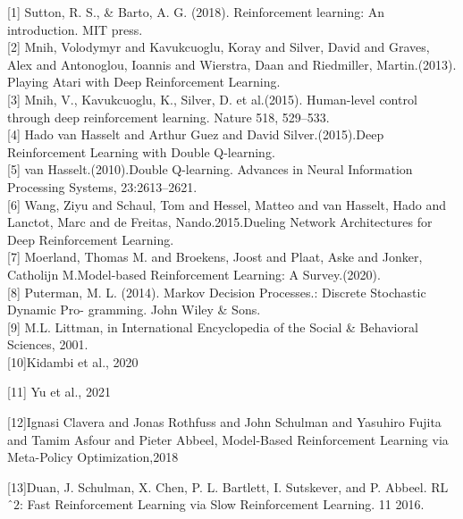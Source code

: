 \begin{thebibliography}{69}


   [1] Sutton, R. S., \& Barto, A. G. (2018). Reinforcement learning: An introduction. MIT press.\\

  [2]  Mnih, Volodymyr and Kavukcuoglu, Koray and Silver, David and Graves, Alex and Antonoglou, Ioannis and Wierstra, Daan and Riedmiller, Martin.(2013). Playing Atari with Deep Reinforcement Learning.\\

  [3] Mnih, V., Kavukcuoglu, K., Silver, D. et al.(2015). Human-level control through deep reinforcement learning. Nature 518, 529–533.\\

  [4] Hado van Hasselt and Arthur Guez and David Silver.(2015).Deep Reinforcement Learning with Double Q-learning.\\

  [5] van Hasselt.(2010).Double Q-learning. Advances in Neural Information Processing Systems, 23:2613–2621.\\
    
    
  [6] Wang, Ziyu and Schaul, Tom and Hessel, Matteo and van Hasselt, Hado and Lanctot, Marc and de Freitas, Nando.2015.Dueling Network Architectures for Deep Reinforcement Learning.\\
    
    
  [7] Moerland, Thomas M. and Broekens, Joost and Plaat, Aske and Jonker, Catholijn M.Model-based Reinforcement Learning: A Survey.(2020).\\
   
   
  [8] Puterman, M. L. (2014). Markov Decision Processes.: Discrete Stochastic Dynamic Pro- gramming. John Wiley \& Sons.\\
   
   
  [9] M.L. Littman, in International Encyclopedia of the Social \& Behavioral Sciences, 2001.\\
  
  [10]Kidambi et al., 2020
  
  [11] Yu et al., 2021
  
  [12]Ignasi Clavera and Jonas Rothfuss and John Schulman and Yasuhiro Fujita and Tamim Asfour and Pieter Abbeel,
 Model-Based Reinforcement Learning via Meta-Policy Optimization,2018
 
  [13]Duan, J. Schulman, X. Chen, P. L. Bartlett, I. Sutskever, and P. Abbeel. RL$ˆ2$: Fast Reinforcement
Learning via Slow Reinforcement Learning. 11 2016.


\end{thebibliography}
